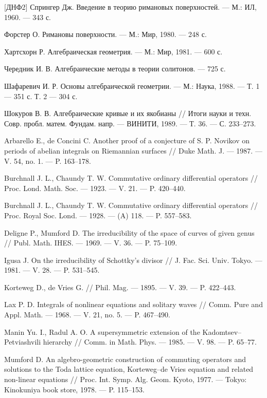 \documentclass{article}
\theoremstyle{definition}
\theoremstyle{definition} %
\theoremstyle{remark}     %
\theoremstyle{definition}
\theoremstyle{definition}
\theoremstyle{definition}
\theoremstyle{definition}
\theoremstyle{definition}
\theoremstyle{definition}
\theoremstyle{definition}
\theoremstyle{definition}
\begin{document}
\begin{thebibliography}{[ДНФ2]}
 Спрингер Дж. Введение в теорию римановых поверхностей. --- М.: ИЛ, 1960. --- 343 с.

 Форстер О. Римановы поверхности. --- М.: Мир, 1980. --- 248 с.

 Хартсхорн Р. Алгебраическая геометрия. --- М.: Мир, 1981. --- 600 с.

 Чередник И. В. Алгебраические методы в теории солитонов. --- 725 с.

 Шафаревич И. Р. Основы алгебраической геометрии. --- М.: Наука, 1988. --- Т. 1 --- 351 с. Т. 2 --- 304 с.

 Шокуров В. В. Алгебраические кривые и их якобианы // Итоги науки и техн. Совр. пробл. матем. Фундам. напр. --- ВИНИТИ, 1989. --- Т. 36. --- С. 233--273.

 Arbarello E., de Concini C. Another proof of a conjecture of S. P. Novikov on periods of abelian integrals on Riemannian surfaces // Duke Math. J. --- 1987. --- V. 54, no. 1. --- P. 163--178.

 Burchnall J. L., Chaundy T. W. Commutative ordinary differential operators // Proc. Lond. Math. Soc. --- 1923. --- V. 21. --- P. 420--440.

 Burchnall J. L., Chaundy T. W. Commutative ordinary differential operators // Proc. Royal Soc. Lond. --- 1928. --- (A) 118. --- P. 557--583.

 Deligne P., Mumford D. The irreducibility of the space of curves of given genus // Publ. Math. IHES. --- 1969. --- V. 36. --- P. 75--109.

 Igusa J. On the irreducibility of Schottky's divisor // J. Fac. Sci. Univ. Tokyo. --- 1981. --- V. 28. --- P. 531--545.

 Korteweg D., de Vries G. // Phil. Mag. --- 1895. --- V. 39. --- P. 422--443.

 Lax P. D. Integrals of nonlinear equations and solitary waves // Comm. Pure and Appl. Math. --- 1968. --- V. 21, no. 5. --- P. 467--490.

 Manin Yu. I., Radul A. O. A supersymmetric extension of the Kadomtsev--Petviashvili hierarchy // Comm. in Math. Phys. --- 1985. --- V. 98. --- P. 65--77.

 Mumford D. An algebro-geometric construction of commuting operators and solutions to the Toda lattice equation, Korteweg--de Vries equation and related non-linear equations // Proc. Int. Symp. Alg. Geom. Kyoto, 1977. --- Tokyo: Kinokuniya book store, 1978. --- P. 115--153.


\end{thebibliography}
\end{document}
